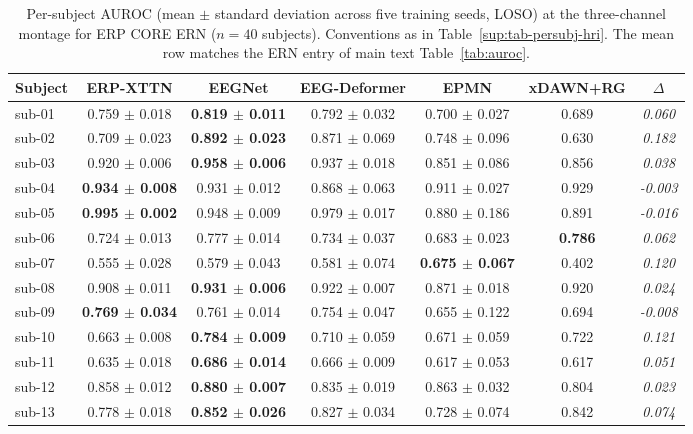 \begin{table}[t]
\centering
\caption{%
Per-subject AUROC (mean $\pm$ standard deviation across five training seeds, LOSO) at the three-channel montage for ERP CORE ERN ($n = 40$ subjects). Conventions as in Table~\ref{sup:tab-persubj-hri}. The mean row matches the ERN entry of main text Table~\ref{tab:auroc}.%
}
\label{sup:tab-persubj-ern}
\begin{tabular}{lcccccc}
\toprule
Subject & ERP-XTTN & EEGNet & EEG-Deformer & EPMN & xDAWN+RG & $\Delta$ \\
\midrule
sub-01 & 0.759 $\pm$ 0.018 & \textbf{0.819 $\pm$ 0.011} & 0.792 $\pm$ 0.032 & 0.700 $\pm$ 0.027 & 0.689 & \textit{0.060} \\
sub-02 & 0.709 $\pm$ 0.023 & \textbf{0.892 $\pm$ 0.023} & 0.871 $\pm$ 0.069 & 0.748 $\pm$ 0.096 & 0.630 & \textit{0.182} \\
sub-03 & 0.920 $\pm$ 0.006 & \textbf{0.958 $\pm$ 0.006} & 0.937 $\pm$ 0.018 & 0.851 $\pm$ 0.086 & 0.856 & \textit{0.038} \\
sub-04 & \textbf{0.934 $\pm$ 0.008} & 0.931 $\pm$ 0.012 & 0.868 $\pm$ 0.063 & 0.911 $\pm$ 0.027 & 0.929 & \textit{-0.003} \\
sub-05 & \textbf{0.995 $\pm$ 0.002} & 0.948 $\pm$ 0.009 & 0.979 $\pm$ 0.017 & 0.880 $\pm$ 0.186 & 0.891 & \textit{-0.016} \\
sub-06 & 0.724 $\pm$ 0.013 & 0.777 $\pm$ 0.014 & 0.734 $\pm$ 0.037 & 0.683 $\pm$ 0.023 & \textbf{0.786} & \textit{0.062} \\
sub-07 & 0.555 $\pm$ 0.028 & 0.579 $\pm$ 0.043 & 0.581 $\pm$ 0.074 & \textbf{0.675 $\pm$ 0.067} & 0.402 & \textit{0.120} \\
sub-08 & 0.908 $\pm$ 0.011 & \textbf{0.931 $\pm$ 0.006} & 0.922 $\pm$ 0.007 & 0.871 $\pm$ 0.018 & 0.920 & \textit{0.024} \\
sub-09 & \textbf{0.769 $\pm$ 0.034} & 0.761 $\pm$ 0.014 & 0.754 $\pm$ 0.047 & 0.655 $\pm$ 0.122 & 0.694 & \textit{-0.008} \\
sub-10 & 0.663 $\pm$ 0.008 & \textbf{0.784 $\pm$ 0.009} & 0.710 $\pm$ 0.059 & 0.671 $\pm$ 0.059 & 0.722 & \textit{0.121} \\
sub-11 & 0.635 $\pm$ 0.018 & \textbf{0.686 $\pm$ 0.014} & 0.666 $\pm$ 0.009 & 0.617 $\pm$ 0.053 & 0.617 & \textit{0.051} \\
sub-12 & 0.858 $\pm$ 0.012 & \textbf{0.880 $\pm$ 0.007} & 0.835 $\pm$ 0.019 & 0.863 $\pm$ 0.032 & 0.804 & \textit{0.023} \\
sub-13 & 0.778 $\pm$ 0.018 & \textbf{0.852 $\pm$ 0.026} & 0.827 $\pm$ 0.034 & 0.728 $\pm$ 0.074 & 0.842 & \textit{0.074} \\

\end{tabular}
\end{table}
